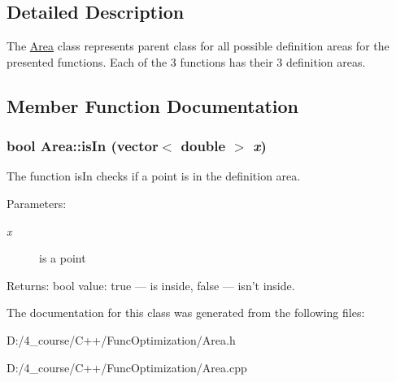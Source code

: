 \subsection{Detailed Description}
The \hyperlink{class_area}{Area} class represents parent class for all possible definition areas for the presented functions. Each of the 3 functions has their 3 definition areas. 

\subsection{Member Function Documentation}
\hypertarget{class_area_13129e0e7d3f3f4fc6edaeeef47996cb}{
\subsubsection[{isIn}]{\setlength{\rightskip}{0pt plus 5cm}bool Area::isIn (vector$<$ double $>$ {\em x})}}
\label{class_area_13129e0e7d3f3f4fc6edaeeef47996cb}


The function isIn checks if a point is in the definition area.

\begin{Desc}
\item[Parameters:]
\begin{description}
\item[{\em x}]is a point \end{description}
\end{Desc}
\begin{Desc}
\item[Returns:]bool value: true --- is inside, false --- isn't inside. \end{Desc}


The documentation for this class was generated from the following files:\begin{CompactItemize}
\item 
D:/4\_\-course/C++/FuncOptimization/Area.h\item 
D:/4\_\-course/C++/FuncOptimization/Area.cpp\end{CompactItemize}
